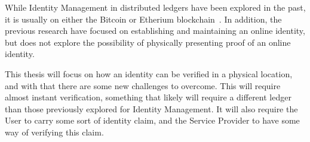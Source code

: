 While Identity Management in distributed ledgers have been explored in the past, it is usually on either the Bitcoin or Etherium blockchain~\cite{Azouvi2017,Augot2017}.  In addition, the previous research have focused on establishing and maintaining an online identity, but does not explore the possibility of physically presenting proof of an online identity.

This thesis will focus on how an identity can be verified in a physical location, and with that there are some new challenges to overcome. This will require almost instant verification, something that likely will require a different ledger than those previously explored for Identity Management. It will also require the User to carry some sort of identity claim, and the Service Provider to have some way of verifying this claim. 


